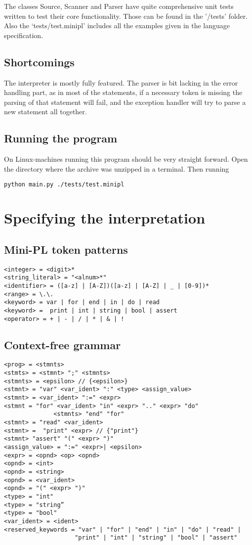 \documentclass[12pt,a4paper]{article}
\begin{document}
The classes Source, Scanner and Parser have quite comprehensive
unit tests written to test their core functionality. Those
can be found in the '/tests' folder.
Also the `tests/test.minipl' includes all the examples given
in the language specification.

\subsection{Shortcomings}
The interpreter is mostly fully featured. The parser is bit lacking
in the error handling part, as in most of the statements, if a 
necessary token is missing the parsing of that statement will fail,
and the exception handler will try to parse a new statement all together.

\subsection{Running the program}

On Linux-machines running this program should be very straight forward.
Open the directory where the archive was unzipped in a terminal.
Then running 
\begin{lstlisting}[language=Sh]
python main.py ./tests/test.minipl
\end{lstlisting}

\section{Specifying the interpretation}

\subsection{Mini-PL token patterns}

\begin{verbatim}
<integer> = <digit>*
<string_literal> = "<alnum>*"
<identifier> = ([a-z] | [A-Z])([a-z] | [A-Z] | _ | [0-9])*
<range> = \.\.
<keyword> = var | for | end | in | do | read 
<keyword> =  print | int | string | bool | assert
<operator> = + | - | / | * | & | !
\end{verbatim}

\subsection{Context-free grammar}
\begin{verbatim}
<prog> = <stmnts>
<stmts> = <stmnt> ";" <stmnts>
<stmnts> = <epsilon> // {<epsilon>}
<stmnt> = "var" <var_ident> ":" <type> <assign_value>
<stmnt> = <var_ident> ":=" <expr>
<stmnt = "for" <var_ident> "in" <expr> ".." <expr> "do"
              <stmnts> "end" "for"
<stmnt> = "read" <var_ident> 
<stmnt> =  "print" <expr> // {"print"}
<stmnt> "assert" "(" <expr> ")"
<assign_value> = ":=" <expr>| <epsilon>
<expr> = <opnd> <op> <opnd>
<opnd> = <int>
<opnd> = <string>
<opnd> = <var_ident>
<opnd> = "(" <expr> ")"
<type> = "int"
<type> = "string”
<type> = "bool"
<var_ident> = <ident>
<reserved_keywords = "var" | "for" | "end" | "in" | "do" | "read" |
                    "print" | "int" | "string" | "bool" | "assert"
\end{verbatim}
\end{document}
